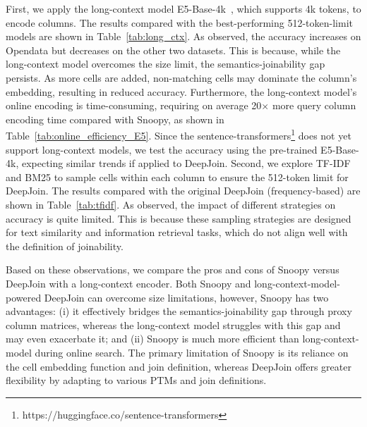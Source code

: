  

 First, we apply the long-context model E5-Base-4k~\cite{E5-Base-4k}, which supports 4k tokens, to encode columns. The results compared with the best-performing 512-token-limit models are shown in Table~\ref{tab:long_ctx}.
As observed, the accuracy increases on Opendata but decreases on the other two datasets. This is because,  while the long-context model overcomes the size limit, the semantics-joinability gap persists. As more cells are added, non-matching cells may dominate the column's embedding, resulting in reduced accuracy. Furthermore, the long-context model's online encoding is time-consuming, requiring on average 20$\times$ more query column encoding time compared with \textsf{Snoopy}, as shown in Table~\ref{tab:online_efficiency_E5}.
Since the sentence-transformers\footnote{https://huggingface.co/sentence-transformers} does not yet support long-context models, we test the accuracy using the pre-trained E5-Base-4k, expecting similar trends if applied to DeepJoin.
Second, we explore TF-IDF and BM25 to sample cells within each column to ensure the 512-token limit for DeepJoin. The results compared with the original DeepJoin (frequency-based) are shown in Table~\ref{tab:tfidf}. As observed, the impact of different strategies on accuracy is quite limited. This is because these sampling strategies are designed for text similarity and information retrieval tasks, which do not align well with the definition of joinability.


Based on these observations, we compare the pros and cons of \textsf{Snoopy} versus DeepJoin with a long-context encoder. Both \textsf{Snoopy} and long-context-model-powered DeepJoin can overcome size limitations, however, \textsf{Snoopy} has two advantages: (i) it effectively bridges the semantics-joinability gap through proxy column matrices, whereas the long-context model struggles with this gap and may even exacerbate it; and (ii) \textsf{Snoopy} is much more efficient than long-context-model during online search. The primary limitation of \textsf{Snoopy} is its reliance on the cell embedding function and join definition, whereas DeepJoin offers greater flexibility by adapting to various PTMs and join definitions.


